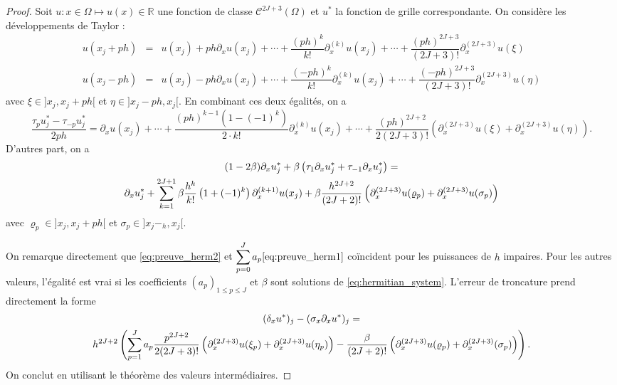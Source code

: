 \begin{proof}
Soit $u : x \in \Omega \mapsto u(x) \in \mathbb{R}$ une fonction de classe $\mathcal{C}^{2J+3}( \Omega)$ et $u^*$ la fonction de grille correspondante.
On considère les développements de Taylor :
\begin{equation}
\begin{array}{rcl}
u(x_j + ph) & = & u(x_j) + p h \partial_x u(x_j) + \cdots + \dfrac{(ph)^k}{k!}\partial_x^{(k)}u(x_j) + \cdots +\dfrac{(ph)^{2J+3}}{(2J+3)!} \partial_x^{(2J+3)}u(\xi)\\
u(x_j - ph) & = & u(x_j) - p h \partial_x u(x_j) + \cdots + \dfrac{(-ph)^k}{k!}\partial_x^{(k)} u(x_j) + \cdots +\dfrac{(-ph)^{2J+3}}{(2J+3)!} \partial_x^{(2J+3)}u(\eta)
\end{array}
\end{equation}
avec $\xi \in ]x_j, x_j+ph[$ et $\eta \in ]x_j-ph, x_j[$. En combinant ces deux égalités, on a
\begin{equation}
\dfrac{\tau_p u^*_j - \tau_{-p} u^*_j}{2ph} = \partial_x u(x_j) + \cdots + \dfrac{(ph)^{k-1}(1 - (-1)^k)}{2 \cdot k!} \partial_x^{(k)}u(x_j) + \cdots +\dfrac{(ph)^{2J+2}}{2(2J+3)!} \left( \partial_x^{(2J+3)}u(\xi) + \partial_x^{(2J+3)}u(\eta) \right).
\label{eq:preuve_herm1}
\end{equation}
D'autres part, on a 
\begin{multline}
(1-2\beta) \partial_x u^*_j + \beta \left( \tau_1 \partial_xu^*_{j} + \tau_{-1} \partial_xu^*_{j} \right) = \\
 \partial_x u^*_j +  \displaystyle\sum\limits_{k=1}^{2J+1} \beta \dfrac{h^{k}}{k!} \left( 1 + (-1)^k \right) \partial_x^{(k+1)}u(x_j)+ \beta \dfrac{h^{2J+2}}{(2J+2)!} \left(\partial_x^{(2J+3)}u(\varrho_p) + \partial_x^{(2J+3)}u(\sigma_p) \right) 
\label{eq:preuve_herm2}
\end{multline}
avec $\varrho_p \in ]x_j, x_j + ph[$ et $\sigma_p \in ]x_j - _h , x_j[$. 

On remarque directement que \eqref{eq:preuve_herm2} et $\displaystyle\sum\limits_{p=0}^J a_p  \eqref{eq:preuve_herm1}$ coïncident pour les puissances de $h$ impaires. 
Pour les autres valeurs, l'égalité est vrai si les coefficients $(a_p)_{1 \leq p \leq J}$ et $\beta$ sont solutions de \eqref{eq:hermitian_system}. L'erreur de troncature prend directement la forme 
\begin{multline}
(\delta_{x} u^*)_j - (\sigma_{x} \partial_x u^*)_j = \\
h^{2J+2} \left( \displaystyle\sum\limits_{p=1}^J a_p  \dfrac{p^{2J+2}}{2(2J+3)!} \left( \partial_x^{(2J+3)}u(\xi_p) + \partial_x^{(2J+3)}u(\eta_p) \right) - \dfrac{\beta}{(2J+2)!} \left(\partial_x^{(2J+3)}u(\varrho_p) + \partial_x^{(2J+3)}(\sigma_p) \right) \right).
\end{multline}
On conclut en utilisant le théorème des valeurs intermédiaires.
\end{proof}

